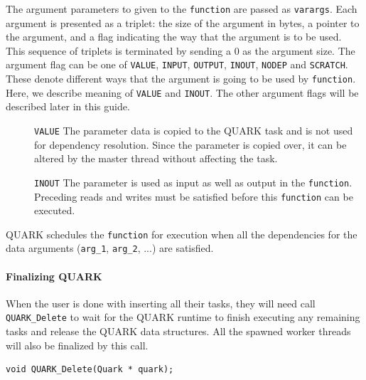 \documentclass[11pt,letterpaper]{report}
\begin{document}
The argument parameters to given to the \verb|function| are passed as
\verb|varargs|.  Each argument is presented as a triplet: the size of
the argument in bytes, a pointer to the argument, and a flag
indicating the way that the argument is to be used.  This sequence of
triplets is terminated by sending a 0 as the argument size.  The
argument flag can be one of \verb|VALUE|, \verb|INPUT|, \verb|OUTPUT|,
\verb|INOUT|, \verb|NODEP| and \verb|SCRATCH|.  These denote different
ways that the argument is going to be used by \verb|function|.  Here,
we describe meaning of \verb|VALUE| and \verb|INOUT|.  The other
argument flags will be described later in this guide.
\begin{description}
\item[]\verb|VALUE| The parameter data is copied to the QUARK task and
  is not used for dependency resolution.  Since the parameter is
  copied over, it can be altered by the master thread without
  affecting the task.
\item[]\verb|INOUT| The parameter is used as input as well as output
  in the \verb|function|.  Preceding reads and writes must be
  satisfied before this \verb|function| can be executed.
\end{description}
QUARK schedules the \verb|function| for execution when all the
dependencies for the data arguments (\verb|arg_1|, \verb|arg_2|, ...)
are satisfied.

\paragraph{Finalizing QUARK}
When the user is done with inserting all their tasks, they will need
call \verb|QUARK_Delete| to wait for the QUARK runtime to finish
executing any remaining tasks and release the QUARK data structures.
All the spawned worker threads will also be finalized by this call.
\begin{samepage}
\begin{lstlisting}
void QUARK_Delete(Quark * quark);
\end{lstlisting}
\end{samepage}
\end{document}
